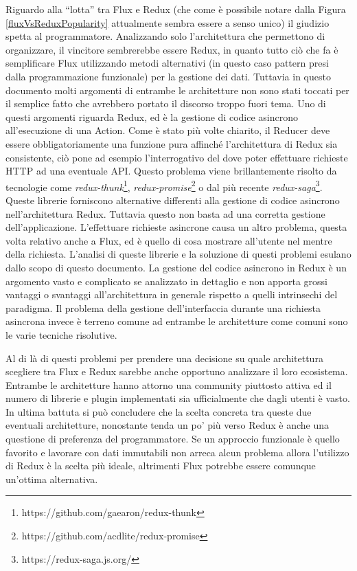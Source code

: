 Riguardo alla “lotta” tra Flux e Redux (che come è possibile notare dalla Figura \ref{fluxVsReduxPopularity} attualmente sembra essere a senso unico) il giudizio spetta al programmatore. Analizzando solo l'architettura che permettono di organizzare, il vincitore sembrerebbe essere Redux, in quanto tutto ciò che fa è semplificare Flux utilizzando metodi alternativi (in questo caso pattern presi dalla programmazione funzionale) per la gestione dei dati. Tuttavia in questo documento molti argomenti di entrambe le architetture non sono stati toccati per il semplice fatto che avrebbero portato il discorso troppo fuori tema.
Uno di questi argomenti riguarda Redux, ed è la gestione di codice asincrono all'esecuzione di una Action. Come è stato più volte chiarito, il Reducer deve essere obbligatoriamente una funzione pura affinché l'architettura di Redux sia consistente, ciò pone ad esempio l'interrogativo del dove poter effettuare richieste HTTP ad una eventuale API. Questo problema viene brillantemente risolto da tecnologie come \textit{redux-thunk}\footnote{https://github.com/gaearon/redux-thunk}, \textit{redux-promise}\footnote{https://github.com/acdlite/redux-promise} o dal più recente \textit{redux-saga}\footnote{https://redux-saga.js.org/}. Queste librerie forniscono alternative differenti alla gestione di codice asincrono nell'architettura Redux. Tuttavia questo non basta ad una corretta gestione dell'applicazione. L'effettuare richieste asincrone causa un altro problema, questa volta relativo anche a Flux, ed è quello di cosa mostrare all'utente nel mentre della richiesta. L'analisi di queste librerie e la soluzione di questi problemi esulano dallo scopo di questo documento. La gestione del codice asincrono in Redux è un argomento vasto e complicato se analizzato in dettaglio e non apporta grossi vantaggi o svantaggi all'architettura in generale rispetto a quelli intrinsechi del paradigma. Il problema della gestione dell'interfaccia durante una richiesta asincrona invece è terreno comune ad entrambe le architetture come comuni sono le varie tecniche risolutive.

Al di là di questi problemi per prendere una decisione su quale architettura scegliere tra Flux e Redux sarebbe anche opportuno analizzare il loro ecosistema. Entrambe le architetture hanno attorno una community piuttosto attiva ed il numero di librerie e plugin implementati sia ufficialmente che dagli utenti è vasto.
In ultima battuta si può concludere che la scelta concreta tra queste due eventuali architetture, nonostante tenda un po' più verso Redux è anche una questione di preferenza del programmatore. Se un approccio funzionale è quello favorito e lavorare con dati immutabili non arreca alcun problema allora l'utilizzo di Redux è la scelta più ideale, altrimenti Flux potrebbe essere comunque un'ottima alternativa.
